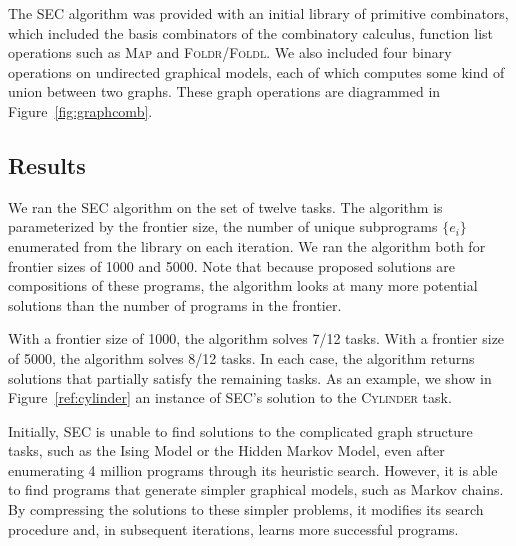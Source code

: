 \documentclass{article} %
\begin{document}
The SEC algorithm was provided with an initial library of primitive  combinators, which included the basis combinators of the combinatory calculus, function list operations such as \textsc{Map} and \textsc{Foldr}/\textsc{Foldl}. We also included four binary operations on undirected graphical models, each of which computes some kind of union between two graphs. These graph operations are diagrammed in Figure~\ref{fig:graphcomb}.




\subsection{Results}

We ran the SEC algorithm on the set of twelve tasks. The algorithm is parameterized by the frontier size, the number of unique subprograms $\{e_i\}$ enumerated from the library on each iteration. We ran the algorithm both for frontier sizes of 1000 and 5000. Note that because proposed solutions are compositions of these programs, the algorithm looks at many more potential solutions than the number of programs in the frontier. 

With a frontier size of 1000, the algorithm solves 7/12 tasks. With a frontier size of 5000, the algorithm solves 8/12 tasks. In each case, the algorithm returns solutions that partially satisfy the remaining tasks. As an example, we show in Figure~\ref{ref:cylinder} an instance of SEC's solution to the \textsc{Cylinder} task. 

Initially, SEC is unable to find solutions to the complicated graph structure tasks, such as the Ising Model or the Hidden Markov Model, even after enumerating 4 million programs through its heuristic search.
However, it is able to find programs that generate simpler graphical models, such as Markov chains.
By compressing the solutions to these simpler problems, it modifies its search procedure and, in subsequent iterations, learns more successful programs.
\end{document}
